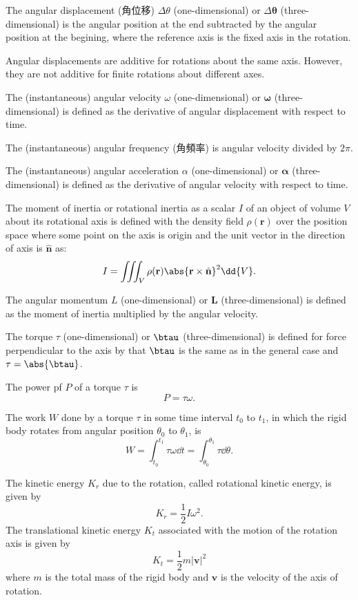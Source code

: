 \documentclass[a4paper,12pt]{article}
\begin{document}
The angular displacement (角位移) $\Delta\theta$ (one-dimensional) or $\Delta\boldsymbol{\theta}$ (three-dimensional) is the angular position at the end subtracted by the angular position at the begining, where the reference axis is the fixed axis in the rotation.

Angular displacements are additive for rotations about the same axis. However, they are not additive for finite rotations about different axes.

The (instantaneous) angular velocity $\omega$ (one-dimensional) or $\boldsymbol{\omega}$ (three-dimensional) is defined as the derivative of angular displacement with respect to time.

The (instantaneous) angular frequency (角頻率) is angular velocity divided by $2\pi$.

The (instantaneous) angular acceleration $\alpha$ (one-dimensional) or $\boldsymbol{\alpha}$ (three-dimensional) is defined as the derivative of angular velocity with respect to time.

The moment of inertia or rotational inertia as a scalar $I$ of an object of volume $V$ about its rotational axis is defined with the density field $\rho(\mathbf{r})$ over the position space where some point on the axis is origin and the unit vector in the direction of axis is $\hat{\mathbf{n}}$ as:
\[I=\iiint_V\rho(\mathbf{r})\abs{\mathbf{r}\times\hat{\mathbf{n}}}^2\dd{V}.\]

The angular momentum $L$ (one-dimensional) or $\mathbf{L}$ (three-dimensional) is defined as the moment of inertia multiplied by the angular velocity.

The torque $\tau$ (one-dimensional) or $\btau$ (three-dimensional) is defined for force perpendicular to the axis by that $\btau$ is the same as in the general case and $\tau=\abs{\btau}$.

The power pf $P$ of a torque $\tau$ is
\[P=\tau\omega.\]

The work $W$ done by a torque $\tau$ in some time interval $t_0$ to $t_1$, in which the rigid body rotates from angular position $\theta_0$ to $\theta_1$, is
\[W=\int_{t_0}^{t_1}\tau\omega\dd{t}=\int_{\theta_0}^{\theta_1}\tau\dd{\theta}.\]

The kinetic energy $K_r$ due to the rotation, called rotational kinetic energy, is given by
\[K_r=\frac{1}{2}I\omega^2.\]
The translational kinetic energy $K_t$ associated with the motion of the rotation axis is given by
\[K_t=\frac{1}{2}m|\mathbf{v}|^2\]
where $m$ is the total mass of the rigid body and $\mathbf{v}$ is the velocity of the axis of rotation.
\end{document}
